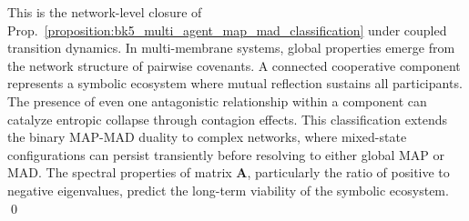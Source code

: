 \begin{demonstratio}
\label{demonstratio:bk5_emergent_global_properties}
This is the network-level closure of Prop.~\ref{proposition:bk5_multi_agent_map_mad_classification} under coupled transition dynamics.
In multi-membrane systems, global properties emerge from the network structure of pairwise covenants. A connected cooperative component represents a symbolic ecosystem where mutual reflection sustains all participants. The presence of even one antagonistic relationship within a component can catalyze entropic collapse through contagion effects.
This classification extends the binary MAP-MAD duality to complex networks, where mixed-state configurations can persist transiently before resolving to either global MAP or MAD. The spectral properties of matrix $\mathbf{A}$, particularly the ratio of positive to negative eigenvalues, predict the long-term viability of the symbolic ecosystem. \qed
\end{demonstratio}
